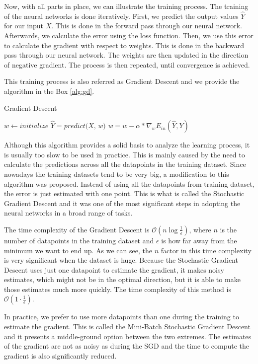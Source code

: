 Now, with all parts in place, we can illustrate the training process.
The training of the neural networks is done iteratively.
First, we predict the output values $\hat{Y}$ for our input $X$.
This is done in the forward pass through our neural network.
Afterwards, we calculate the error using the loss function.
Then, we use this error to calculate the gradient with respect to weights.
This is done in the backward pass through our neural network.
The weights are then updated in the direction of negative gradient.
The process is then repeated, until convergence is achieved.

This training process is also referred as Gradient Descent and we provide the algorithm in the Box \ref{alg:gd}.

\begin{algorithm}
\caption{Gradient Descent}
\label{alg:gd}
\begin{algorithmic}[1]
\State $w \gets \textit{initialize}$
\Repeat
\State $\hat{Y} = \textit{predict(X, w)}$
\State $w = w - \alpha * \nabla_w E_{in}(\hat{Y}, Y)$
\end{algorithmic}
\end{algorithm}

Although this algorithm provides a solid basis to analyze the learning process, it is usually too slow to be used in practice.
This is mainly caused by the need to calculate the predictions across all the datapoints in the training dataset.
Since nowadays the training datasets tend to be very big, a modification to this algorithm was proposed.
Instead of using all the datapoints from training dataset, the error is just estimated with one point.
This is what is called the Stochastic Gradient Descent and it was one of the most significant steps in adopting the neural networks in a broad range of tasks.

The time complexity of the Gradient Descent is $\mathcal{O}(n\log{\frac{1}{\epsilon}})$, where $n$ is the number of datapoints in the training dataset and $\epsilon$ is how far away from the minimum we want to end up.
As we can see, the $n$ factor in this time complexity is very significant when the dataset is huge.
Because the Stochastic Gradient Descent uses just one datapoint to estimate the gradient, it makes noisy estimates, which might not be in the optimal direction, but it is able to make those estimates much more quickly.
The time complexity of this method is $\mathcal{O}(1\cdot\frac{1}{\epsilon})$.

In practice, we prefer to use more datapoints than one during the training to estimate the gradient.
This is called the Mini-Batch Stochastic Gradient Descent and it presents a middle-ground option between the two extremes.
The estimates of the gradient are not as noisy as during the SGD and the time to compute the gradient is also significantly reduced. 

